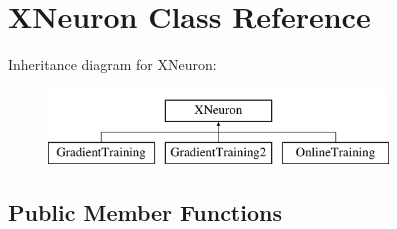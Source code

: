 \hypertarget{class_x_neuron}{}\section{X\+Neuron Class Reference}
\label{class_x_neuron}
Inheritance diagram for X\+Neuron\+:\begin{figure}[H]
\begin{center}
\leavevmode
\includegraphics[height=2.000000cm]{class_x_neuron}
\end{center}
\end{figure}
\subsection*{Public Member Functions}
